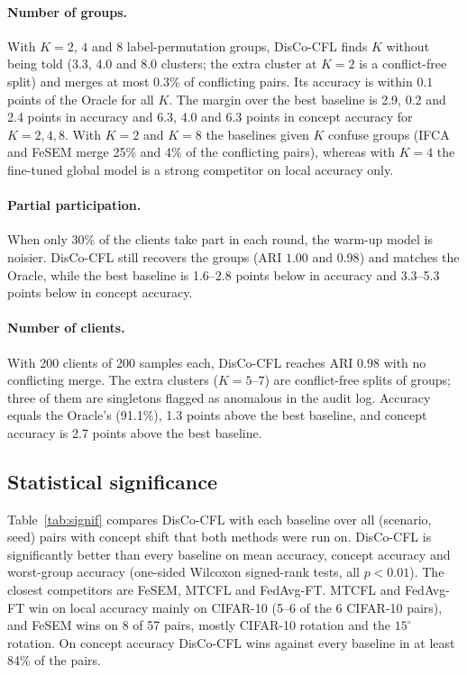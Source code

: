 \paragraph{Number of groups.} With $K=2$, $4$ and $8$ label-permutation groups, DisCo-CFL finds $K$ without being told (3.3, 4.0 and 8.0 clusters; the extra cluster at $K=2$ is a conflict-free split) and merges at most 0.3\% of conflicting pairs. Its accuracy is within $0.1$ points of the Oracle for all $K$. The margin over the best baseline is 2.9, 0.2 and 2.4 points in accuracy and 6.3, 4.0 and 6.3 points in concept accuracy for $K=2,4,8$. With $K=2$ and $K=8$ the baselines given $K$ confuse groups (IFCA and FeSEM merge 25\% and 4\% of the conflicting pairs), whereas with $K=4$ the fine-tuned global model is a strong competitor on local accuracy only.

\paragraph{Partial participation.} When only 30\% of the clients take part in each round, the warm-up model is noisier. DisCo-CFL still recovers the groups (ARI $1.00$ and $0.98$) and matches the Oracle, while the best baseline is 1.6--2.8 points below in accuracy and 3.3--5.3 points below in concept accuracy.

\paragraph{Number of clients.} With 200 clients of 200 samples each, DisCo-CFL reaches ARI $0.98$ with no conflicting merge. The extra clusters ($K=5$--$7$) are conflict-free splits of groups; three of them are singletons flagged as anomalous in the audit log. Accuracy equals the Oracle's (91.1\%), 1.3 points above the best baseline, and concept accuracy is 2.7 points above the best baseline.

\subsection{Statistical significance}
Table~\ref{tab:signif} compares DisCo-CFL with each baseline over all (scenario, seed) pairs with concept shift that both methods were run on. DisCo-CFL is significantly better than every baseline on mean accuracy, concept accuracy and worst-group accuracy (one-sided Wilcoxon signed-rank tests, all $p<0.01$). The closest competitors are FeSEM, MTCFL and FedAvg-FT. MTCFL and FedAvg-FT win on local accuracy mainly on CIFAR-10 (5--6 of the 6 CIFAR-10 pairs), and FeSEM wins on 8 of 57 pairs, mostly CIFAR-10 rotation and the $15^\circ$ rotation. On concept accuracy DisCo-CFL wins against every baseline in at least 84\% of the pairs.

